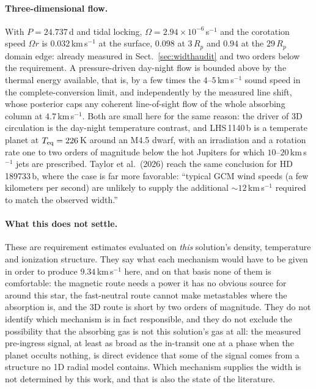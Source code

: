 \documentclass[english,a4paper]{my_memo}
\begin{document}
\paragraph{Three-dimensional flow.}
With $P = 24.737$\,d and tidal locking,
$\Omega = 2.94\times 10^{-6}$\,s$^{-1}$ and the corotation speed $\Omega r$
is $0.032$\,km\,s$^{-1}$ at the surface, $0.098$ at $3\,R_p$ and $0.94$ at
the $29\,R_p$ domain edge: already measured in Sect.~\ref{sec:widthaudit} and
two orders below the requirement. A pressure-driven day-night flow is bounded
above by the thermal energy available, that is, by a few times the
$4$--$5$\,km\,s$^{-1}$ sound speed in the complete-conversion limit, and
independently by the measured line shift, whose posterior caps any coherent
line-of-sight flow of the whole absorbing column at $4.7$\,km\,s$^{-1}$. Both
are small here for the same reason: the driver of 3D circulation is the
day-night temperature contrast, and LHS\,1140\,b is a temperate planet at
$T_{\rm eq} = 226$\,K around an M4.5 dwarf, with an irradiation and a
rotation rate one to two orders of magnitude below the hot Jupiters for which
$10$--$20$\,km\,s$^{-1}$ jets are prescribed. Taylor et al.\ (2026) reach the
same conclusion for HD\,189733\,b, where the case is far more favorable:
``typical GCM wind speeds (a few kilometers per second) are unlikely to
supply the additional $\sim 12$\,km\,s$^{-1}$ required to match the observed
width.''

\paragraph{What this does not settle.} These are requirement estimates
evaluated on \emph{this} solution's density, temperature and ionization
structure. They say what each mechanism would have to be given in order to
produce $9.34$\,km\,s$^{-1}$ here, and on that basis none of them is
comfortable: the magnetic route needs a power it has no obvious source for
around this star, the fast-neutral route cannot make metastables where the
absorption is, and the 3D route is short by two orders of magnitude. They do
not identify which mechanism is in fact responsible, and they do not exclude
the possibility that the absorbing gas is not this solution's gas at all: the
measured pre-ingress signal, at least as broad as the in-transit one at a
phase when the planet occults nothing, is direct evidence that some of the
signal comes from a structure no 1D radial model contains. Which mechanism
supplies the width is not determined by this work, and that is also the state
of the literature.
\end{document}
